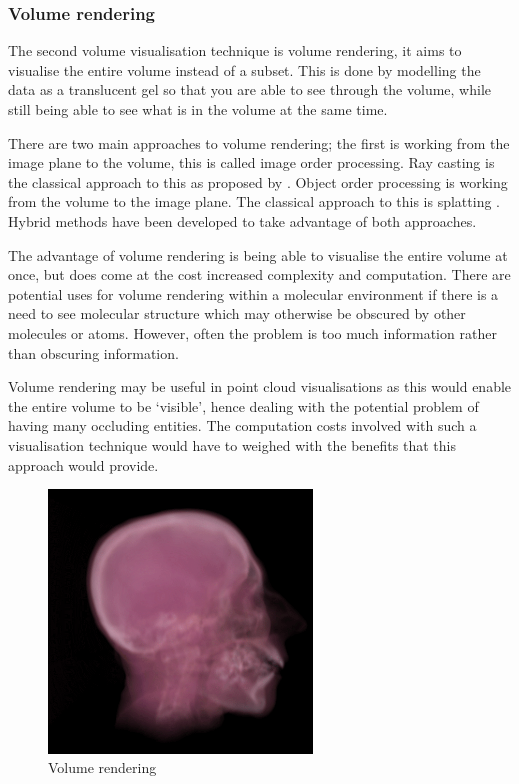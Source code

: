 \documentclass[a4paper]{article}
\begin{document}
\subsubsection*{Volume rendering}
The second volume visualisation technique is volume rendering, it aims to
visualise the entire volume instead of a subset. This is done by modelling the
data as a translucent gel so that you are able to see through the volume, while
still being able to see what is in the volume at the same time.

There are two main approaches to volume rendering; the first is working from the
image plane to the volume, this is called image order processing. Ray casting is
the classical approach to this as proposed by \citet{levoy88}. Object order
processing is working from the volume to the image plane. The classical approach
to this is splatting \citep{westover89}. Hybrid methods have been developed to
take advantage of both approaches.

The advantage of volume rendering is being able to visualise the entire volume
at once, but does come at the cost increased complexity and computation. There
are potential uses for volume rendering within a molecular environment if there
is a need to see molecular structure which may otherwise be obscured by other
molecules or atoms. However, often the problem is too much information rather
than obscuring information.

Volume rendering may be useful in point cloud visualisations as this would
enable the entire volume to be `visible', hence dealing with the potential
problem of having many occluding entities. The computation costs involved with
such a visualisation technique would have to weighed with the benefits that this
approach would provide.

\begin{figure}[h!]
  \begin{center}
    \includegraphics[width=70mm]{head_volume}
  \end{center}
  \caption{Volume rendering}
  \label{fig:headvolume}
\end{figure}
\end{document}
